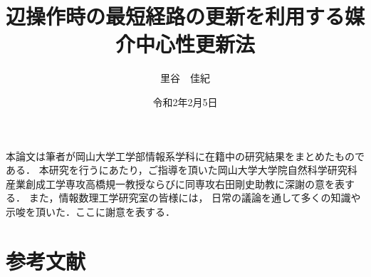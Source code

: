 \documentclass[11pt]{jreport}
\title{辺操作時の最短経路の更新を利用する媒介中心性更新法}
\author{里谷　佳紀}
\date{令和2年2月5日} %
\theoremstyle{mythmstyle}
\begin{document}
\maketitle








\acknowledgment
本論文は筆者が岡山大学工学部情報系学科に在籍中の研究結果をまとめたものである．
本研究を行うにあたり，ご指導を頂いた岡山大学大学院自然科学研究科
産業創成工学専攻高橋規一教授ならびに同専攻右田剛史助教に深謝の意を表する．
また，情報数理工学研究室の皆様には，
日常の議論を通して多くの知識や示唆を頂いた．ここに謝意を表する．

\chapter*{参考文献}
\makeatletter
{}
\makeatother
\printbibliography[heading=none]
\end{document}
